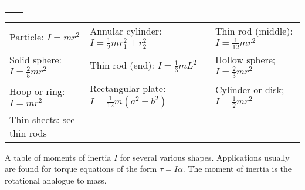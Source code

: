 \begin{longtable}{p{} p{}}			
	\tablesubsection{Moment of Inertia Formul\ae}
	\label{ssec:moment-inertia}\\
    &\\%
\end{longtable}	
\vspace{-2cm}
\begin{tabular}{l l l}
    Particle: \( I = mr^2 \) & Annular cylinder: \( \displaystyle I = \frac{1}{2}{m}{r_1^2 + r_2^2} \) & Thin rod (middle): \( \displaystyle I = \frac{1}{12}{m}{r^2} \) \\ 
    Solid sphere: \( \displaystyle I = \frac{2}{5}{m}{r^2} \) & Thin rod (end): \( \displaystyle I = \frac{1}{3}{m}{L^2} \) & Hollow sphere; \( \displaystyle I = \frac{2}{3}{m}{r^2} \) \\
    Hoop or ring: \( I = mr^2 \) & Rectangular plate: \( \displaystyle I = \frac{1}{12}{m}(a^2 + b^2) \) & Cylinder or disk; \( \displaystyle I = \frac{1}{2}{m}{r^2} \) \\
    Thin sheets: see thin rods & & \\
    \bottomrule
\end{tabular}

A table of moments of inertia $I$ for several various shapes. Applications usually are found for torque equations of the form \( \tau = I \alpha \). The moment of inertia is the rotational analogue to mass.
